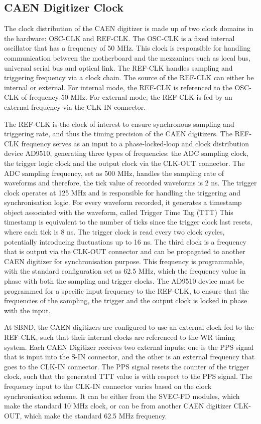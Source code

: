 \subsection{CAEN Digitizer Clock}
\label{subsec41PMT}
The clock distribution of the CAEN digitizer is made up of two clock domains in the hardware: OSC-CLK and REF-CLK.
The OSC-CLK is a fixed internal oscillator that has a frequency of 50 MHz. 
This clock is responsible for handling communication between the motherboard and the mezzanines such as local bus, universal serial bus and optical link.
The REF-CLK handles sampling and triggering frequency via a clock chain.
The source of the REF-CLK can either be internal or external.
For internal mode, the REF-CLK is referenced to the OSC-CLK of frequency 50 MHz.
For external mode, the REF-CLK is fed by an external frequency via the CLK-IN connector. 

The REF-CLK is the clock of interest to ensure synchronous sampling and triggering rate, and thus the timing precision of the CAEN digitizers.
The REF-CLK frequency serves as an input to a phase-locked-loop and clock distribution device AD9510, generating three types of frequencies: the ADC sampling clock, the trigger logic clock and the output clock via the CLK-OUT connector.
The ADC sampling frequency, set as 500 MHz, handles the sampling rate of waveforms and therefore, the tick value of recorded waveforms is 2 ns. 
The trigger clock operates at 125 MHz and is responsible for handling the triggering and synchronisation logic.
For every waveform recorded, it generates a timestamp object associated with the waveform, called Trigger Time Tag (TTT)
This timestamp is equivalent to the number of ticks since the trigger clock last resets, where each tick is 8 ns.
The trigger clock is read every two clock cycles, potentially introducing fluctuations up to 16 ns.
The third clock is a frequency that is output via the CLK-OUT connector and can be propagated to another CAEN digitizer for synchronisation purpose.
This frequency is programmable, with the standard configuration set as 62.5 MHz, which the frequency value in phase with both the sampling and trigger clocks.
The AD9510 device must be programmed for a specific input frequency to the REF-CLK, to ensure that the frequencies of the sampling, the trigger and the output clock is locked in phase with the input.

At SBND, the CAEN digitizers are configured to use an external clock fed to the REF-CLK, such that their internal clocks are referenced to the WR timing system. 
Each CAEN Digitizer receives two external inputs: one is the PPS signal that is input into the S-IN connector, and the other is an external frequency that goes to the CLK-IN connector.
The PPS signal resets the counter of the trigger clock, such that the generated TTT value is with respect to the PPS signal.
The frequency input to the CLK-IN connector varies based on the clock synchronisation scheme. 
It can be either from the SVEC-FD modules, which make the standard 10 MHz clock, or can be from another CAEN digitizer CLK-OUT, which make the standard 62.5 MHz frequency.


